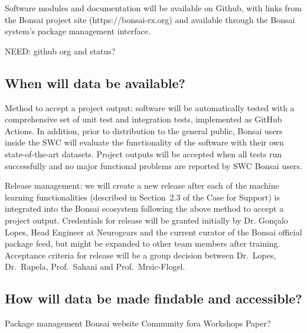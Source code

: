\documentclass[a4paper,11pt]{article}
\begin{document}
Software modules and documentation will be available on Github, with links from
the Bonsai project site (https://bonsai-rx.org) and available through the
Bonsai system's package management interface.

NEED: github org and status?


\subsection{When will data be available?}


Method to accept a project output: software will be automatically tested with a
comprehensive set of unit test and integration tests, implemented as  GitHub
Actions. In addition, prior to distribution to the general public, Bonsai users
inside the SWC will evaluate the functionality of the software with their own
state-of-the-art datasets. Project outputs will be accepted when all tests run
successfully and no major functional problems are reported by SWC Bonsai users.

Release management: we will create a new release after each of the machine
learning functionalities (described in Section~2.3 of the Case for Support) is
integrated into the Bonsai ecosystem following the above method to accept a
project output. Credentials for release will be granted initially by Dr.
Gonçalo Lopes, Head Engineer at Neurogears and the current curator of the
Bonsai official package feed, but might be expanded to other team members after
training.  Acceptance criteria for release will be a group decision between
Dr.~Lopes, Dr.~Rapela, Prof.~Sahani and Prof.~Mrsic-Flogel.

\subsection{How will data be made findable and accessible?}

Package management
Bonsai website
Community fora
Workshops
Paper?
\end{document}
